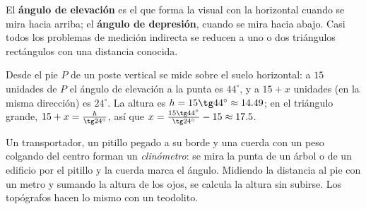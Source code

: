 \documentclass[11pt]{article}
\begin{document}
El \textbf{ángulo de elevación} es el que forma la visual con la horizontal
cuando se mira hacia arriba; el \textbf{ángulo de depresión}, cuando se mira
hacia abajo. Casi todos los problemas de medición indirecta se reducen a uno o
dos triángulos rectángulos con una distancia conocida.

\begin{ejemplo}
Desde el pie $P$ de un poste vertical se mide sobre el suelo horizontal: a $15$
unidades de $P$ el ángulo de elevación a la punta es $44^\circ$, y a $15 + x$
unidades (en la misma dirección) es $24^\circ$. La altura es
$h = 15\tg 44^\circ \approx \num{14,49}$; en el triángulo grande,
$15 + x = \frac{h}{\tg 24^\circ}$, así que $x = \frac{15\tg 44^\circ}{\tg 24^\circ} - 15 \approx \num{17,5}$.

\begin{center}
\end{center}
\end{ejemplo}

\begin{aplicacion}
Un transportador, un pitillo pegado a su borde y una cuerda con un peso colgando
del centro forman un \emph{clinómetro}: se mira la punta de un árbol o de un
edificio por el pitillo y la cuerda marca el ángulo. Midiendo la distancia al
pie con un metro y sumando la altura de los ojos, se calcula la altura sin
subirse. Los topógrafos hacen lo mismo con un teodolito.
\end{aplicacion}
\end{document}
